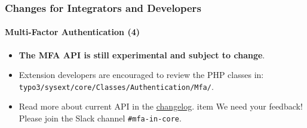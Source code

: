 %

\begin{frame}[fragile]
	\frametitle{Changes for Integrators and Developers}
	\framesubtitle{Multi-Factor Authentication (4)}

	\begin{itemize}

		\item \textbf{The MFA API is still experimental and subject to change}.
		\item Extension developers are encouraged to review the PHP classes in:\newline
			\small\texttt{typo3/sysext/core/Classes/Authentication/Mfa/}.\normalsize
		\item Read more about current API in the
			\href{https://docs.typo3.org/c/typo3/cms-core/master/en-us/Changelog/11.1/Feature-93526-MultiFactorAuthentication.rst}{changelog}.
		item We need your feedback! Please join the Slack channel \texttt{\#mfa-in-core}.

	\end{itemize}

\end{frame}

